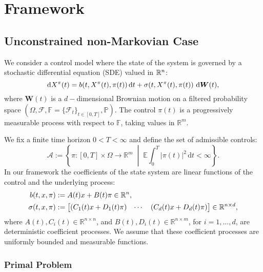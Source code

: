 \chapter{Framework}

\section{Unconstrained non-Markovian Case}

We consider a control model where the state of the system is governed by a stochastic differential equation (SDE) valued in $\mathbb{R}^n$:
\begin{equation}
    \mathrm{d}X^\pi(t) = b(t, X^\pi(t), \pi(t)) \, \mathrm{d}t + \sigma(t, X^\pi(t), \pi(t)) \, \mathop{}\!\mathrm{d} \bm{W} (t), \label{eq: state_process_primal}
\end{equation}
where $\bm{W}(t)$ is a $d-$dimensional Brownian motion on a filtered probability space $(\Omega, \mathcal{F}, \mathbb{F} = \{\mathcal{F}_t\}_{t \in [0,T]}, \mathbb{P})$. The control $\pi(t)$ is a progressively measurable process with respect to $\mathbb{F}$, taking values in $\mathbb{R}^m$.

We fix a finite time horizon \( 0 < T < \infty \) and define the set of admissible controls:
\begin{equation*}
    \mathcal{A} := \left\{ \pi : [0, T] \times \Omega \to \mathbb{R}^m \;\middle|\; \mathbb{E} \int_0^T |\pi(t)|^2 \, \mathrm{d}t < \infty \right\}.
\end{equation*}
In our framework the coefficients of the state system are linear functions of the control and the underlying process:
\begin{align*}
    b(t, x, \pi) &:= A(t) x + B(t)\pi \in \mathbb{R}^n,  \\
    \sigma(t, x, \pi) &:= 
    \begin{bmatrix}
        (C_1(t) x + D_1(t)\pi) & \cdots & (C_d(t) x + D_d(t)\pi)
    \end{bmatrix} \in \mathbb{R}^{n \times d},
\end{align*}
where $A(t), C_i(t) \in \mathbb{R}^{n \times n}$, and $B(t), D_i(t) \in \mathbb{R}^{n \times m}$, for \( i = 1, \dots, d \), are deterministic coefficient processes. We assume that these coefficient processes are uniformly bounded and measurable functions.

\subsection{Primal Problem}

